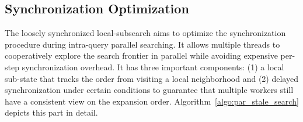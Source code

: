 

\subsection{Synchronization Optimization} 
\label{subsec:loosely_sync}

The loosely synchronized local-subsearch aims to optimize the synchronization procedure during intra-query parallel searching.
It allows multiple threads to cooperatively explore the search frontier in parallel while avoiding expensive per-step synchronization overhead. It has three important components: 
(1) a local sub-state that tracks the order from visiting a local neighborhood
and (2) delayed synchronization under certain conditions to guarantee that multiple workers still have a consistent view on the expansion order. 
Algorithm~\ref{algo:par_stale_search} depicts this part in detail. 

